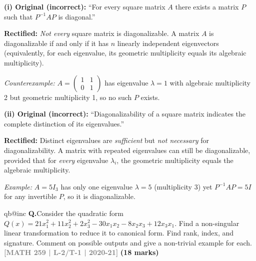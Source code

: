\documentclass[12pt,a3paper]{article}
\makeatletter
\newcommand{\yr}[1]{\hfill\textcolor{gray}{\small\textbf{[#1]}}}
\newcommand{\mk}[1]{\textcolor{orange!70!black}{\small\textbf{(#1 marks)}}}
\newcounter{qnum}
\newcommand{\Q}[1]{%
  \csname qb@inc\endcsname
  \needspace{4\baselineskip}
  \refstepcounter{qnum}
  \vspace{6pt}
  \noindent\textbf{Q\theqnum.}\enspace #1\par
}
\makeatother
\begin{document}
\begin{tcolorbox}[enhanced,breakable,
  colback=cE!4,colframe=cE,boxrule=0.8pt,arc=5pt,
  title={\textbf{Answer --- Rectifying Incorrect Statements on Diagonalization}},
  fonttitle=\bfseries\color{white},colbacktitle=cE]

\textbf{(i) Original (incorrect):} ``For every square matrix $A$ there exists a matrix $P$ such that $P^{-1}AP$ is diagonal.''

\textbf{Rectified:} \emph{Not every} square matrix is diagonalizable. A matrix $A$ is diagonalizable if and only if it has $n$ linearly independent eigenvectors (equivalently, for each eigenvalue, its geometric multiplicity equals its algebraic multiplicity). 

\textit{Counterexample:} $A=\begin{pmatrix}1&1\\0&1\end{pmatrix}$ has eigenvalue $\lambda=1$ with algebraic multiplicity 2 but geometric multiplicity 1, so no such $P$ exists.

\medskip
\textbf{(ii) Original (incorrect):} ``Diagonalizability of a square matrix indicates the complete distinction of its eigenvalues.''

\textbf{Rectified:} Distinct eigenvalues are \emph{sufficient} but \emph{not necessary} for diagonalizability. A matrix with repeated eigenvalues can still be diagonalizable, provided that for \emph{every} eigenvalue $\lambda_i$, the geometric multiplicity equals the algebraic multiplicity.

\textit{Example:} $A=5I_3$ has only one eigenvalue $\lambda=5$ (multiplicity 3) yet $P^{-1}AP=5I$ for any invertible $P$, so it is diagonalizable.

\end{tcolorbox}


\Q{Consider the quadratic form $Q(x) = 21x_1^2 + 11x_2^2 + 2x_3^2 - 30x_1x_2 - 8x_2x_3 + 12x_3x_1$. Find a non-singular linear transformation to reduce it to canonical form. Find rank, index, and signature. Comment on possible outputs and give a non-trivial example for each.
\yr{MATH 259 | L-2/T-1 | 2020-21} \mk{18}}
\end{document}
